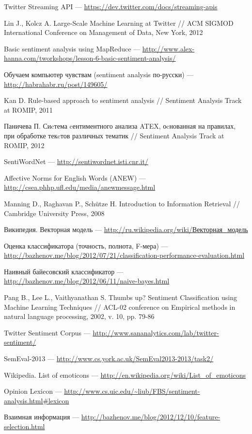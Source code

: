 Twitter Streaming API --- \url{https://dev.twitter.com/docs/streaming-apis}

Lin J., Kolcz A. Large-Scale Machine Learning at Twitter // ACM SIGMOD International Conference on Management of Data, New York, 2012

Basic sentiment analysis using MapReduce --- \url{http://www.alex-hanna.com/tworkshops/lesson-6-basic-sentiment-analysis/}

Обучаем компьютер чувствам (sentiment analysis по-русски) --- \url{http://habrahabr.ru/post/149605/}

Kan D. Rule-based approach to sentiment analysis // Sentiment Analysis Track at ROMIP, 2011

Паничева П. Сиcтема cентиментного анализа ATEX, оcнованная
на правилах, при обработке текcтов различных тематик // Sentiment Analysis Track at ROMIP, 2012

SentiWordNet --- \url{http://sentiwordnet.isti.cnr.it/}

Affective Norms for English Words (ANEW) --- \url{http://csea.phhp.ufl.edu/media/anewmessage.html}

Manning D., Raghavan P., Schütze H. Introduction to Information Retrieval // Cambridge University Press, 2008

Википедия. Векторная модель --- \href{http://ru.wikipedia.org/wiki/%D0%92%D0%B5%D0%BA%D1%82%D0%BE%D1%80%D0%BD%D0%B0%D1%8F_%D0%BC%D0%BE%D0%B4%D0%B5%D0%BB%D1%8C}{http://ru.wikipedia.org/wiki/Векторная\_модель}

Оценка классификатора (точность, полнота, F-мера) --- \url{http://bazhenov.me/blog/2012/07/21/classification-performance-evaluation.html}

Наивный байесовский классификатор --- \url{http://bazhenov.me/blog/2012/06/11/naive-bayes.html}

Pang B., Lee L., Vaithyanathan S. Thumbs up? Sentiment Classification using Machine Learning Techniques // ACL-02 conference on Empirical methods in natural language processing, 2002, v. 10, pp. 79-86

Twitter Sentiment Corpus --- \url{http://www.sananalytics.com/lab/twitter-sentiment/}

SemEval-2013 --- \url{http://www.cs.york.ac.uk/SemEval2013-2013/task2/}

Wikipedia. List of emoticons --- \url{http://en.wikipedia.org/wiki/List_of_emoticons}

Opinion Lexicon --- \url{http://www.cs.uic.edu/~liub/FBS/sentiment-analysis.html#lexicon}

Взаимная информация --- \url{http://bazhenov.me/blog/2012/12/10/feature-selection.html}